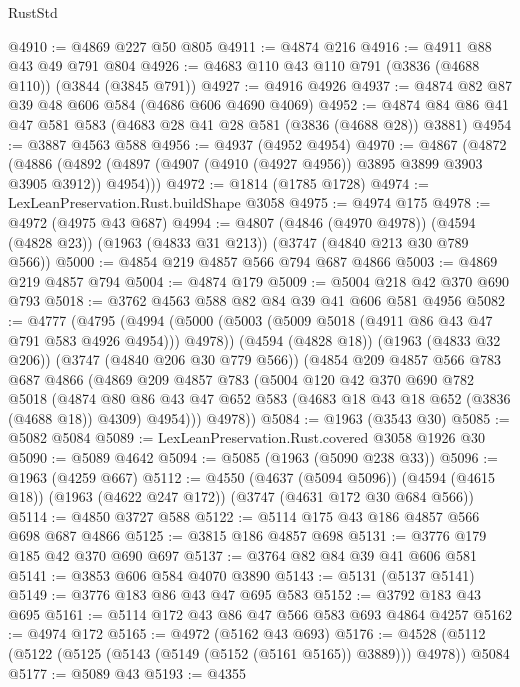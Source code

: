 \begin{lexlean}{RustStd}
\begin{coremodule}
@4910 := @4869 @227 @50 @805
@4911 := @4874 @216
@4916 := @4911 @88 @43 @49 @791 @804
@4926 := @4683 @110 @43 @110 @791 (@3836 (@4688 @110)) (@3844 (@3845 @791))
@4927 := @4916 @4926
@4937 := @4874 @82 @87 @39 @48 @606 @584 (@4686 @606 @4690 @4069)
@4952 := @4874 @84 @86 @41 @47 @581 @583 (@4683 @28 @41 @28 @581 (@3836 (@4688 @28)) @3881)
@4954 := @3887 @4563 @588
@4956 := @4937 (@4952 @4954)
@4970 := @4867
    (@4872
      (@4886 (@4892 (@4897 (@4907 (@4910 (@4927 @4956)) @3895 @3899 @3903 @3905 @3912)) @4954)))
@4972 := @1814 (@1785 @1728)
@4974 := LexLeanPreservation.Rust.buildShape @3058
@4975 := @4974 @175
@4978 := @4972 (@4975 @43 @687)
@4994 := @4807
    (@4846 (@4970 @4978))
    (@4594 (@4828 @23))
    (@1963 (@4833 @31 @213))
    (@3747 (@4840 @213 @30 @789 @566))
@5000 := @4854 @219 @4857 @566 @794 @687 @4866
@5003 := @4869 @219 @4857 @794
@5004 := @4874 @179
@5009 := @5004 @218 @42 @370 @690 @793
@5018 := @3762 @4563 @588 @82 @84 @39 @41 @606 @581 @4956
@5082 := @4777
    (@4795
      (@4994 (@5000 (@5003 (@5009 @5018 (@4911 @86 @43 @47 @791 @583 @4926 @4954))) @4978))
      (@4594 (@4828 @18))
      (@1963 (@4833 @32 @206))
      (@3747 (@4840 @206 @30 @779 @566))
      (@4854
        @209
        @4857
        @566
        @783
        @687
        @4866
        (@4869
          @209
          @4857
          @783
          (@5004
            @120
            @42
            @370
            @690
            @782
            @5018
            (@4874
              @80
              @86
              @43
              @47
              @652
              @583
              (@4683 @18 @43 @18 @652 (@3836 (@4688 @18)) @4309)
              @4954)))
        @4978))
@5084 := @1963 (@3543 @30)
@5085 := @5082 @5084
@5089 := LexLeanPreservation.Rust.covered @3058 @1926 @30
@5090 := @5089 @4642
@5094 := @5085 (@1963 (@5090 @238 @33))
@5096 := @1963 (@4259 @667)
@5112 := @4550
    (@4637 (@5094 @5096))
    (@4594 (@4615 @18))
    (@1963 (@4622 @247 @172))
    (@3747 (@4631 @172 @30 @684 @566))
@5114 := @4850 @3727 @588
@5122 := @5114 @175 @43 @186 @4857 @566 @698 @687 @4866
@5125 := @3815 @186 @4857 @698
@5131 := @3776 @179 @185 @42 @370 @690 @697
@5137 := @3764 @82 @84 @39 @41 @606 @581
@5141 := @3853 @606 @584 @4070 @3890
@5143 := @5131 (@5137 @5141)
@5149 := @3776 @183 @86 @43 @47 @695 @583
@5152 := @3792 @183 @43 @695
@5161 := @5114 @172 @43 @86 @47 @566 @583 @693 @4864 @4257
@5162 := @4974 @172
@5165 := @4972 (@5162 @43 @693)
@5176 := @4528 (@5112 (@5122 (@5125 (@5143 (@5149 (@5152 (@5161 @5165)) @3889))) @4978)) @5084
@5177 := @5089 @43
@5193 := @4355

\end{coremodule}
\end{lexlean}
